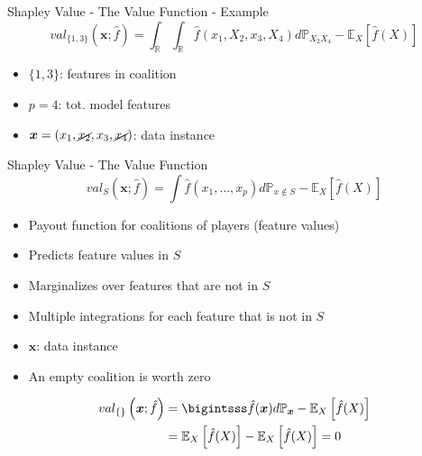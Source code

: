 \begin{frame}{Shapley Value - The Value Function - Example}
	\begin{equation}
		val_{\{1,3\}}\left(\bm{x};\hat{f}\right)=\int_{\mathbb{R}}\int_{\mathbb{R}}\hat{f}(x_{1},X_{2},x_{3},X_{4})d\mathbb{P}_{X_2X_4}-\mathbb{E}_X\left[\hat{f}(X)\right]
	\end{equation}
	\begin{itemize}
		\item $\{1,3\}$: features in coalition
		\item $p = 4$: tot. model features
		\item $\bm{x} = (x_1, \cancel{x_2}, x_3, \cancel{x_4})$: data instance
	\end{itemize}
\end{frame}

\begin{frame}{Shapley Value - The Value Function}
	\begin{equation}
		val_S\left(\bm{x};\hat{f}\right)=\int\hat{f}(x_{1},\ldots,x_{p})d\mathbb{P}_{x\notin{}S}-\mathbb{E}_X\left[\hat{f}(X)\right]
	\end{equation}
	\begin{itemize}
		\item Payout function for coalitions of players (feature values)
		\item Predicts feature values in $S$
		\item Marginalizes over features that are not in $S$
		\item Multiple integrations for each feature that is not in $S$
		\item $\bm{x}$: data instance
		\item An empty coalition is worth zero
	\end{itemize}
	\begin{align}\begin{split}
		val_{\{\}}\left(\bm{x};\hat{f}\right)&=
		\bigintsss\hat{f}(\bm{x})d\mathbb{P}_{\bm{x}}-\mathbb{E}_X\left[\hat{f}(X)\right]\\
		&=\mathbb{E}_X\left[\hat{f}(X)\right]-\mathbb{E}_X\left[\hat{f}(X)\right] = 0
	\end{split}\end{align}
\end{frame}
